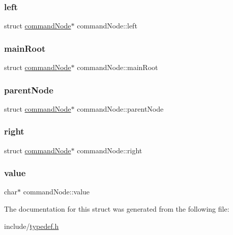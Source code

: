\subsubsection{\texorpdfstring{left}{left}}
{\footnotesize\ttfamily struct \mbox{\hyperlink{structcommandNode}{command\+Node}}$\ast$ command\+Node\+::left}

\mbox{\label{structcommandNode_a92f8c627edb51c5ff72e25d8e50c7a2c}} 
\subsubsection{\texorpdfstring{main\+Root}{mainRoot}}
{\footnotesize\ttfamily struct \mbox{\hyperlink{structcommandNode}{command\+Node}}$\ast$ command\+Node\+::main\+Root}

\mbox{\label{structcommandNode_a51770f48c99c29a08b34477d9bd0c164}} 
\subsubsection{\texorpdfstring{parent\+Node}{parentNode}}
{\footnotesize\ttfamily struct \mbox{\hyperlink{structcommandNode}{command\+Node}}$\ast$ command\+Node\+::parent\+Node}

\mbox{\label{structcommandNode_a66f09364fe9dedd129473880c8e65e44}} 
\subsubsection{\texorpdfstring{right}{right}}
{\footnotesize\ttfamily struct \mbox{\hyperlink{structcommandNode}{command\+Node}}$\ast$ command\+Node\+::right}

\mbox{\label{structcommandNode_a64d65c9b57488418cd5c8e3def5dcbcf}} 
\subsubsection{\texorpdfstring{value}{value}}
{\footnotesize\ttfamily char$\ast$ command\+Node\+::value}



The documentation for this struct was generated from the following file\+:\begin{DoxyCompactItemize}
\item 
include/\mbox{\hyperlink{typedef_8h}{typedef.\+h}}\end{DoxyCompactItemize}
